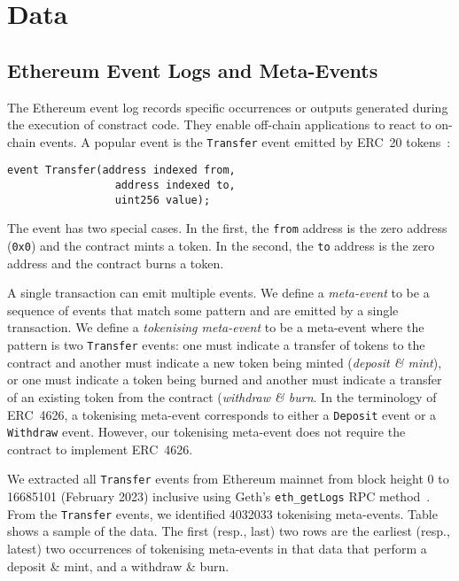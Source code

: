 \section{Data}\label{sec:data}

\subsection{Ethereum Event Logs and Meta-Events}\label{sec:data-event-logs}

The Ethereum event log records specific occurrences or outputs
generated during the execution of constract code.  They enable
off-chain applications to react to on-chain events.  A popular event
is the \texttt{Transfer} event emitted by {ERC}~20
tokens~\cite{vogelsteller-buterin-15}:

\begin{lstlisting}[language=Solidity,
    caption={The {ERC}~20 \texttt{Transfer} event specifies three
      parameters: \texttt{from}, \texttt{to}, and \texttt{value}.}]
  event Transfer(address indexed from,
                 address indexed to,
                 uint256 value);
\end{lstlisting}

The event has two special cases.  In the first, the \texttt{from}
address is the zero address (\texttt{0x0}) and the contract mints a
token.  In the second, the \texttt{to} address is the zero address and
the contract burns a token.

A single transaction can emit multiple events.  We define a
\textit{meta-event} to be a sequence of events that match some pattern
and are emitted by a single transaction.  We define a
\textit{tokenising meta-event} to be a meta-event where the pattern is
two \texttt{Transfer} events: one must indicate a transfer of tokens
to the contract and another must indicate a new token being minted
(\textit{deposit \& mint}), or one must indicate a token being burned
and another must indicate a transfer of an existing token from the
contract (\textit{withdraw \& burn}.  In the terminology of
{ERC}~4626, a tokenising meta-event corresponds to either a
\texttt{Deposit} event or a \texttt{Withdraw} event.  However, our
tokenising meta-event does not require the contract to implement
{ERC}~4626.

We extracted all \texttt{Transfer} events from Ethereum mainnet from
block height \num{0} to \num{16685101} (February 2023) inclusive using
Geth's \texttt{eth\_getLogs} RPC method~\cite{geth-xx}.  From the
\texttt{Transfer} events, we identified \num{4032033} tokenising
meta-events.  Table~\cite{tab:meta-events} shows a sample of the data.
The first (resp., last) two rows are the earliest (resp., latest) two
occurrences of tokenising meta-events in that data that perform a
deposit \& mint, and a withdraw \& burn.

